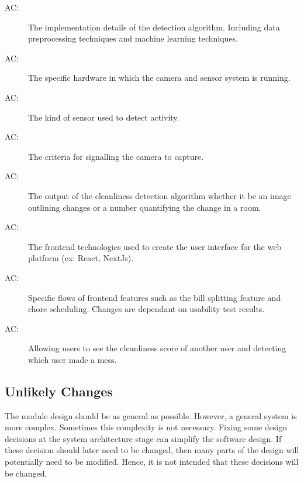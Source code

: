 \documentclass[12pt, titlepage]{article}
\newcounter{acnum}
\newcommand{\actheacnum}{AC\theacnum}
\begin{document}
\begin{description}
\item[ \actheacnum \label{acML}:] The implementation details of the detection algorithm. Including data preprocessing techniques and machine learning techniques.
\item[ \actheacnum \label{acHardware}:] The specific hardware in which the camera and sensor system is running.
\item[ \actheacnum \label{acSensor}:] The kind of sensor used to detect activity.
\item[ \actheacnum \label{acCaptureCriteria}:] The criteria for signalling the camera to capture.
\item[ \actheacnum \label{acAlgoOutput}:] The output of the cleanliness detection algorithm whether it be an image outlining changes or a number quantifying the change in a room.
\item[ \actheacnum \label{acWebFrameworks}:] The frontend technologies used to create the user interface for the web platform (ex: React, NextJs).
\item[ \actheacnum \label{acAppFeatures}:] Specific flows of frontend features such as the bill splitting feature and chore scheduling. Changes are dependant on usability test results.
\item[ \actheacnum \label{acUserDetection}:] Allowing users to see the cleanliness score of another user and detecting which user made a mess.
\end{description}


\subsection{Unlikely Changes} \label{SecUchange}

The module design should be as general as possible. However, a general system is
more complex. Sometimes this complexity is not necessary. Fixing some design
decisions at the system architecture stage can simplify the software design. If
these decision should later need to be changed, then many parts of the design
will potentially need to be modified. Hence, it is not intended that these
decisions will be changed.
\end{document}
